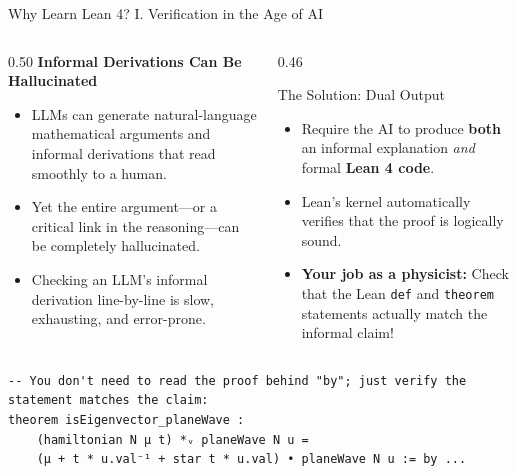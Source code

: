 \documentclass[aspectratio=169, 10pt]{beamer}
\begin{document}
\begin{frame}[fragile]{Why Learn Lean 4? I. Verification in the Age of AI}
  \begin{columns}[T]
    \begin{column}{0.50\textwidth}
      \textbf{Informal Derivations Can Be Hallucinated}
      \begin{itemize}
        \item LLMs can generate natural-language mathematical arguments and informal derivations that read smoothly to a human.
        \item Yet the entire argument---or a critical link in the reasoning---can be completely hallucinated.
        \item Checking an LLM's informal derivation line-by-line is slow, exhausting, and error-prone.
      \end{itemize}
    \end{column}

    \begin{column}{0.46\textwidth}
      \begin{alertblock}{The Solution: Dual Output}
        \begin{itemize}
          \item Require the AI to produce \textbf{both} an informal explanation \emph{and} formal \textbf{Lean 4 code}.
          \item Lean's kernel automatically verifies that the proof is logically sound.
          \item \textbf{Your job as a physicist:} Check that the Lean \texttt{def} and \texttt{theorem} statements actually match the informal claim!
        \end{itemize}
      \end{alertblock}
    \end{column}
  \end{columns}

  \vspace{0.2cm}
\begin{lstlisting}[language=Lean4]
-- You don't need to read the proof behind "by"; just verify the statement matches the claim:
theorem isEigenvector_planeWave :
    (hamiltonian N μ t) *ᵥ planeWave N u =
    (μ + t * u.val⁻¹ + star t * u.val) • planeWave N u := by ...
\end{lstlisting}
\end{frame}
\end{document}
